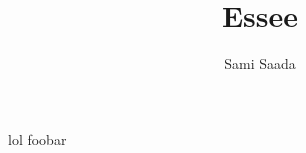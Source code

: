 \documentclass[a4paper]{report}
\author{Sami Saada}
\title{Essee}
\begin{document}
\maketitle

lol foobar
\end{document}

